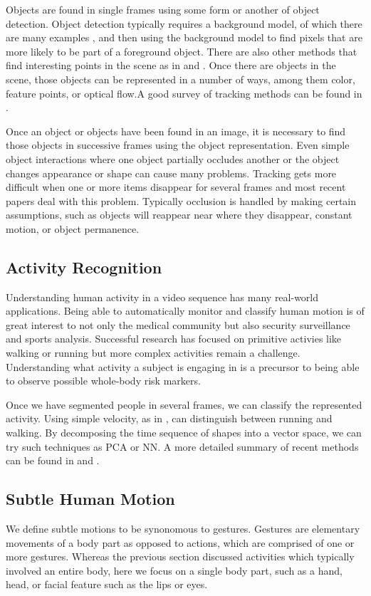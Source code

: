 \documentclass[11pt]{article}
\begin{document}
Objects are found in single frames using some form or another of object detection. Object detection typically requires a background model, of which there are many examples \cite{Elgammal} \cite{Stauffer}, and then using the background model to find pixels that are more likely to be part of a foreground object. There are also other methods that find interesting points in the scene as in \cite{tomasi1991} and \cite{lowe2004}. Once there are objects in the scene, those objects can be represented in a number of ways, among them color, feature points, or optical flow.A good survey of tracking methods can be found in \cite{yilmaz2006}.

Once an object or objects have been found in an image, it is necessary to find those objects in successive frames using the object representation. Even simple object interactions where one object partially occludes another or the object changes appearance or shape can cause many problems. Tracking gets more difficult when one or more items disappear for several frames and most recent papers deal with this problem. Typically occlusion is handled by making certain assumptions, such as objects will reappear near where they disappear\cite{papadourakis2010}, constant motion\cite{iraei2015}, or object permanence\cite{huang2005}.

\subsection{Activity Recognition}
Understanding human activity in a video sequence has many real-world applications. Being able to automatically monitor and classify human motion is of great interest to not only the medical community but also security surveillance and sports analysis. Successful research has focused on primitive activies like walking or running but more complex activities remain a challenge. Understanding what activity a subject is engaging in is a precursor to being able to observe possible whole-body risk markers.

Once we have segmented people in several frames, we can classify the represented activity. Using simple velocity, as in \cite{bodor2003}, can distinguish between running and walking. By decomposing the time sequence of shapes into a vector space, we can try such techniques as PCA\cite{masoud2003} or NN\cite{blank2005}. A more detailed summary of recent methods can be found in \cite{poppe2010} and \cite{aggarwal2011}.

\subsection{Subtle Human Motion}
We define subtle motions to be synonomous to gestures. Gestures are elementary movements of a body part as opposed to actions, which are comprised of one or more gestures. Whereas the previous section discussed activities which typically involved an entire body, here we focus on a single body part, such as a hand, head, or facial feature such as the lips or eyes.
\end{document}
